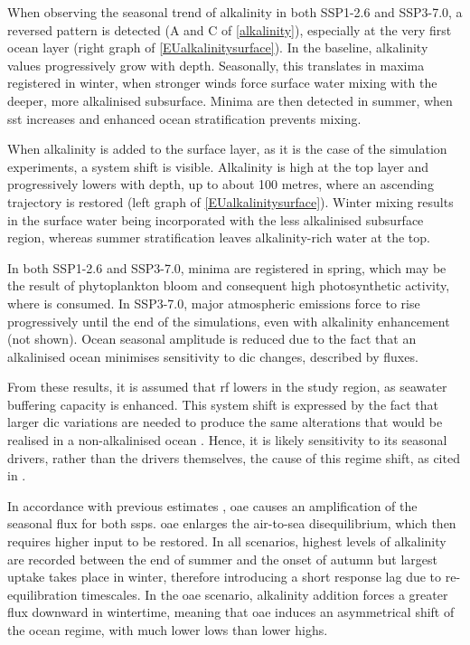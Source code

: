 When observing the seasonal trend of alkalinity in both SSP1-2.6 and SSP3-7.0, a reversed pattern is detected (A and C of \cref{alkalinity}), especially at the very first ocean layer (right graph of \cref{EUalkalinitysurface}). In the baseline, alkalinity values progressively grow with depth. Seasonally, this translates in maxima registered in winter, when stronger winds force surface water mixing with the deeper, more alkalinised subsurface. Minima are then detected in summer, when \ac{sst} increases and enhanced ocean stratification prevents mixing. 

When alkalinity is added to the surface layer, as it is the case of the simulation experiments, a system shift is visible. Alkalinity is high at the top layer and progressively lowers with depth, up to about 100 metres, where an ascending trajectory is restored (left graph of \cref{EUalkalinitysurface}). Winter mixing results in the surface water being incorporated with the less alkalinised subsurface region, whereas summer stratification leaves alkalinity-rich water at the top.

In both SSP1-2.6 and SSP3-7.0,  minima are registered in spring, which may be the result of phytoplankton bloom and consequent high photosynthetic activity, where  is consumed. In SSP3-7.0, major atmospheric  emissions force  to rise progressively until the end of the simulations, even with alkalinity enhancement (not shown). Ocean  seasonal amplitude is reduced due to the fact that an alkalinised ocean minimises  sensitivity to \ac{dic} changes, described by  fluxes.

From these results, it is assumed that \ac{rf} lowers in the study region, as seawater buffering capacity is enhanced. This system shift is expressed by the fact that larger \ac{dic} variations are needed to produce the same  alterations that would be realised in a non-alkalinised ocean \citep{schwinger2022report}. Hence, it is likely  sensitivity to its seasonal drivers, rather than the drivers themselves, the cause of this regime shift, as cited in \cite{lerner2021drivers}.

In accordance with previous estimates \citep{schwinger2022report}, \ac{oae} causes an amplification of the  seasonal flux for both \ac{ssp}s. \ac{oae} enlarges the air-to-sea disequilibrium, which then requires higher  input to be restored. In all scenarios, highest levels of alkalinity are recorded between the end of summer and the onset of autumn but largest uptake takes place in winter, therefore introducing a short response lag due to re-equilibration timescales. In the \ac{oae} scenario, alkalinity addition forces a greater  flux downward in wintertime, meaning that \ac{oae} induces an asymmetrical shift of the ocean regime, with much lower lows than lower highs.

